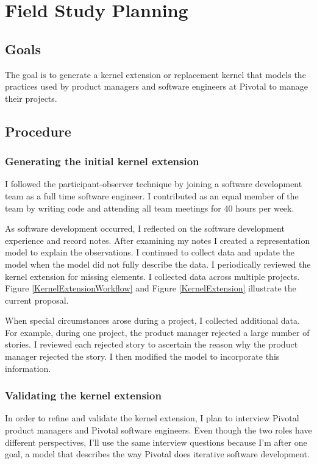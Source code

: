 \documentclass[preprint,12pt,3p]{elsarticle}
\begin{document}
\section{Field Study Planning} 
\label{FieldStudyPlanning}

\subsection{Goals}
The goal is to generate a kernel extension or replacement kernel that models the practices used by product managers and software engineers at Pivotal to manage their projects.

\subsection{Procedure}
\subsubsection{Generating the initial kernel extension}
I followed the participant-observer technique by joining a software development team as a full time software engineer. I contributed as an equal member of the team by writing code and attending all team meetings for 40 hours per week. 

As software development occurred, I reflected on the software development experience and record notes. After examining my notes I created a representation model to explain the observations. I continued to collect data and update the model when the model did not fully describe the data. I periodically reviewed the kernel extension for missing elements. I collected data across multiple projects. Figure \ref{KernelExtensionWorkflow} and Figure \ref{KernelExtension} illustrate the current proposal.

When special circumstances arose during a project, I collected additional data. For example, during one project, the product manager rejected a large number of stories. I reviewed each rejected story to ascertain the reason why the product manager rejected the story. I then modified the model to incorporate this information.

\subsubsection{Validating the kernel extension}

In order to refine and validate the kernel extension, I plan to interview Pivotal product managers and Pivotal software engineers. Even though the two roles have different perspectives, I'll use the same interview questions because I'm after one goal, a model that describes the way Pivotal does iterative software development.
\end{document}
